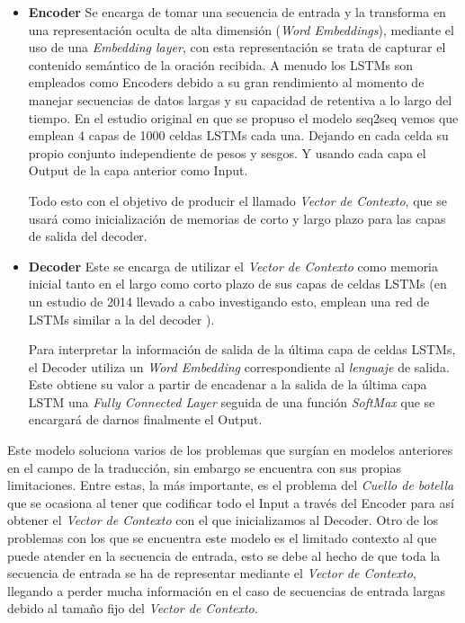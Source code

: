 \begin{itemize}
	\item \textbf{Encoder} Se encarga de tomar una secuencia de entrada y la transforma en una representación oculta de alta dimensión (\textit{Word Embeddings}), mediante el uso de una \textit{Embedding layer}, con esta representación se trata de capturar el contenido semántico de la oración recibida. A menudo los LSTMs son empleados como Encoders debido a su gran rendimiento al momento de manejar secuencias de datos largas y su capacidad de retentiva a lo largo del tiempo. En el estudio original \citep{sutskever2014sequence} en que se propuso el modelo seq2seq vemos que emplean 4 capas de 1000 celdas LSTMs cada una. Dejando en cada celda su propio conjunto independiente de pesos y sesgos. Y usando cada capa el Output de la capa anterior como Input.

Todo esto con el objetivo de producir el llamado \textit{Vector de Contexto}, que se usará como inicialización de memorias de corto y largo plazo para las capas de salida del decoder.

	\item \textbf{Decoder} Este se encarga de utilizar el \textit{Vector de Contexto} como memoria inicial tanto en el largo como corto plazo de sus capas de celdas LSTMs (en un estudio de 2014 llevado a cabo investigando esto, emplean una red de LSTMs similar a la del decoder \citep{sutskever2014sequence}).

Para interpretar la información de salida de la última capa de celdas LSTMs, el Decoder utiliza un \textit{Word Embedding} correspondiente al \textit{lenguaje} de salida. Este obtiene su valor a partir de encadenar a la salida de la última capa LSTM una \textit{Fully Connected Layer} seguida de una función \textit{SoftMax} que se encargará de darnos finalmente el Output.

\end{itemize}

Este modelo soluciona varios de los problemas que surgían en modelos anteriores en el campo de la traducción, sin embargo se encuentra con sus propias limitaciones. Entre estas, la más importante, es el problema del \textit{Cuello de botella} que se ocasiona al tener que codificar todo el Input a través del Encoder para así obtener el \textit{Vector de Contexto} con el que inicializamos al Decoder. Otro de los problemas con los que se encuentra este modelo es el limitado contexto al que puede atender en la secuencia de entrada, esto se debe al hecho de que toda la secuencia de entrada se ha de representar mediante el \textit{Vector de Contexto}, llegando a perder mucha información en el caso de secuencias de entrada largas debido al tamaño fijo del \textit{Vector de Contexto}.

